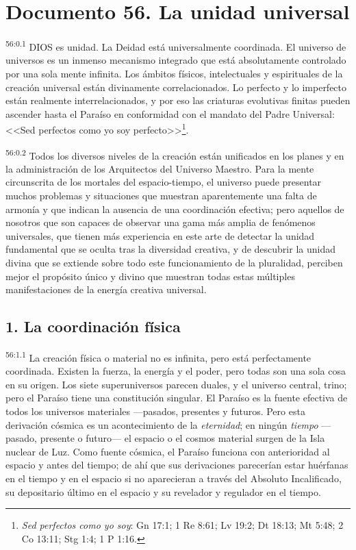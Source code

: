 \chapter{Documento 56. La unidad universal}
\par
\textsuperscript{56:0.1} DIOS es unidad. La Deidad está universalmente coordinada. El universo de universos es un inmenso mecanismo integrado que está absolutamente controlado por una sola mente infinita. Los ámbitos físicos, intelectuales y espirituales de la creación universal están divinamente correlacionados. Lo perfecto y lo imperfecto están realmente interrelacionados, y por eso las criaturas evolutivas finitas pueden ascender hasta el Paraíso en conformidad con el mandato del Padre Universal: <<Sed perfectos como yo soy perfecto>>\footnote{\textit{Sed perfectos como yo soy}: Gn 17:1; 1 Re 8:61; Lv 19:2; Dt 18:13; Mt 5:48; 2 Co 13:11; Stg 1:4; 1 P 1:16.}.

\par
\textsuperscript{56:0.2} Todos los diversos niveles de la creación están unificados en los planes y en la administración de los Arquitectos del Universo Maestro. Para la mente circunscrita de los mortales del espacio-tiempo, el universo puede presentar muchos problemas y situaciones que muestran aparentemente una falta de armonía y que indican la ausencia de una coordinación efectiva; pero aquellos de nosotros que son capaces de observar una gama más amplia de fenómenos universales, que tienen más experiencia en este arte de detectar la unidad fundamental que se oculta tras la diversidad creativa, y de descubrir la unidad divina que se extiende sobre todo este funcionamiento de la pluralidad, perciben mejor el propósito único y divino que muestran todas estas múltiples manifestaciones de la energía creativa universal.

\section*{1. La coordinación física}
\par
\textsuperscript{56:1.1} La creación física o material no es infinita, pero está perfectamente coordinada. Existen la fuerza, la energía y el poder, pero todas son una sola cosa en su origen. Los siete superuniversos parecen duales, y el universo central, trino; pero el Paraíso tiene una constitución singular. El Paraíso es la fuente efectiva de todos los universos materiales ---pasados, presentes y futuros. Pero esta derivación cósmica es un acontecimiento de la \textit{eternidad}; en ningún \textit{tiempo} ---pasado, presente o futuro--- el espacio o el cosmos material surgen de la Isla nuclear de Luz. Como fuente cósmica, el Paraíso funciona con anterioridad al espacio y antes del tiempo; de ahí que sus derivaciones parecerían estar huérfanas en el tiempo y en el espacio si no aparecieran a través del Absoluto Incalificado, su depositario último en el espacio y su revelador y regulador en el tiempo.

